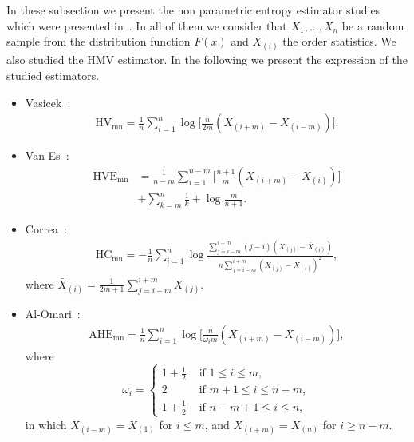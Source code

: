 \documentclass[journal]{IEEEtran}
\begin{document}
In these subsection we present the non parametric entropy estimator studies which were presented in~\cite{AlOmari2016}. In all of them we consider that $X_1,\ldots,X_n$ be a random sample from the distribution function $F(x)$ and $X_{(i)}$ the order statistics. We also studied the HMV estimator.
In the following we present the expression of the studied estimators. 
\begin{itemize}
	\item Vasicek~\cite{Vasicek76}:
	 \begin{align}
	 	\label{HV}
		\text{HV}_\text{{mn}}=\frac{1}{n} \sum_{i=1}^{n} \log \Big[\frac{n}{2 m}\left(X_{(i+m)}-X_{(i-m)}\right)\Big].
	\end{align}
	\item Van Es~\cite{VanEs92}:
	\begin{align}
		\label{HVE}
		\text{HVE}_\text{{mn}}&=\frac{1}{n-m} \sum_{i=1}^{n-m}\Big[\frac{n+1}{m}\left(X_{(i+m)}-X_{(i)}\right)\Big] \nonumber\\
		        &+\sum_{k=m}^{n} \frac{1}{k}+\log \frac{m}{n+1}.
	\end{align}
	\item Correa~\cite{Correa95}:
	\begin{align}
		\label{HC}
		\text{HC}_\text{{mn}}=-\frac{1}{n} \sum_{i=1}^{n} \log \frac{\sum_{j=i-m}^{i+m}(j-i)\left(X_{(j)}-\bar{X}_{(i)}\right)}{n \sum_{j=i-m}^{i+m}\left(X_{(j)}-\bar{X}_{(i)}\right)^{2}},
	\end{align}
where $\bar{X}_{(i)}=\frac{1}{2 m+1} \sum_{j=i-m}^{i+m} X_{(j)}$.
	\item Al-Omari~\cite{AlOmari2014}:
	\begin{align}
	\text{AHE}_\text{{mn}}=\frac{1}{n} \sum_{i=1}^{n} \log \Big[\frac{n}{\omega_{i} m}\left(X_{(i+m)}-X_{(i-m)}\right)\Big], 
		\label{AHE}
	\end{align}
	where
	\begin{equation*}
	\omega_{i}= \begin{cases}
		1+\frac{1}{2} & \text{ if }1 \leq i \leq m, \\
		2 & \text{ if } m+1 \leq i \leq n-m, \\
		1+\frac{1}{2} & \text{ if } n-m+1 \leq i \leq n,
				\end{cases}
	\end{equation*}
	in which $X_{(i-m)}=X_{(1)}$ for $i \leq m$, and $X_{(i+m)}=X_{(n)}$ for $i \geq n-m$.

\end{itemize}
\end{document}
